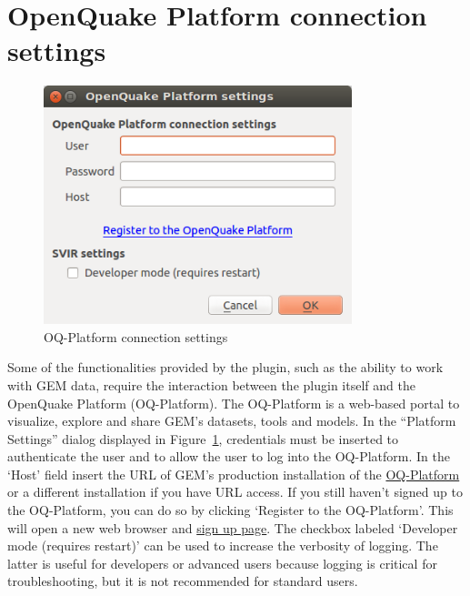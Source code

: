 \section{OpenQuake Platform connection settings}

\begin{figure}
    \centering
    \includegraphics[width=0.8\textwidth]{../images/image07}
    \caption{OQ-Platform connection settings}
    \label{fig:connection_settings}
\end{figure}

Some of the functionalities provided by the plugin, such as the ability to work
with GEM data, require the interaction between the plugin itself and the
OpenQuake Platform (OQ-Platform). The OQ-Platform is a web-based portal to
visualize, explore and share GEM's datasets, tools and models. In the “Platform
Settings” dialog displayed in Figure~\ref{fig:connection_settings}, credentials
must be inserted to authenticate the user and to allow the user to log into the
OQ-Platform. In the ‘Host' field insert the URL of GEM's production
installation of the \href{https://platform.openquake.org}{OQ-Platform} or a
different installation if you have URL access. If you still haven't signed up
to the OQ-Platform, you can do so by clicking `Register to the OQ-Platform'.
This will open a new web browser and
\href{https://platform.openquake.org/account/signup/}{sign up page}.  The
checkbox labeled `Developer mode (requires restart)' can be used to increase
the verbosity of logging. The latter is useful for developers or advanced users
because logging is critical for troubleshooting, but it is not recommended for
standard users.

